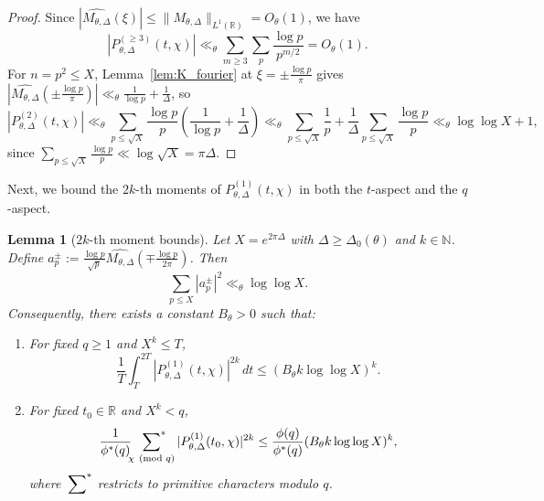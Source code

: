 \documentclass[11pt,a4paper]{amsart}
\newtheorem{lemma}[theorem]{Lemma}
\theoremstyle{remark}
\numberwithin{equation}{section}
\newcommand{\R}{\mathbb{R}}
\newcommand{\N}{\mathbb{N}}
\begin{document}
\begin{proof}
Since $|\widehat{M_{\theta,\Delta}}(\xi)| \le \|M_{\theta,\Delta}\|_{L^1(\R)} = O_\theta(1)$, we have
\[
  |P_{\theta,\Delta}^{(\ge 3)}(t,\chi)| \ll_\theta \sum_{m\ge 3}\sum_p \frac{\log p}{p^{m/2}} = O_\theta(1).
\]
For $n = p^2 \le X$, Lemma~\ref{lem:K_fourier} at $\xi = \pm\frac{\log p}{\pi}$ gives $|\widehat{M_{\theta,\Delta}}(\pm\frac{\log p}{\pi})| \ll_\theta \frac{1}{\log p} + \frac{1}{\Delta}$, so
\[
  |P_{\theta,\Delta}^{(2)}(t,\chi)| \ll_\theta \sum_{p\le\sqrt{X}}\frac{\log p}{p}\left(\frac{1}{\log p}+\frac{1}{\Delta}\right) \ll_\theta \sum_{p\le\sqrt{X}}\frac{1}{p} + \frac{1}{\Delta}\sum_{p\le\sqrt{X}}\frac{\log p}{p} \ll_\theta \log\log X + 1,
\]
since $\sum_{p\le\sqrt{X}}\frac{\log p}{p} \ll \log\sqrt{X} = \pi\Delta$.
\end{proof}

Next, we bound the $2k$-th moments of $P_{\theta,\Delta}^{(1)}(t,\chi)$ in both the $t$-aspect and the $q$-aspect.

\begin{lemma}[$2k$-th moment bounds]\label{lem:moments}
Let $X = e^{2\pi\Delta}$ with $\Delta \ge \Delta_0(\theta)$ and $k \in \N$. Define $a_p^\pm := \frac{\log p}{\sqrt{p}}\widehat{M_{\theta,\Delta}}(\mp\frac{\log p}{2\pi})$. Then
\begin{equation}\label{eq:a_p_l2}
  \sum_{p\le X} |a_p^\pm|^2 \ll_\theta \log\log X.
\end{equation}
Consequently, there exists a constant $B_\theta > 0$ such that:
\begin{enumerate}
  \item[(i)] For fixed $q \ge 1$ and $X^k \le T$,
    \[
      \frac{1}{T}\int_T^{2T} |P_{\theta,\Delta}^{(1)}(t,\chi)|^{2k}\,dt \le (B_\theta k\log\log X)^k.
    \]
  \item[(ii)] For fixed $t_0 \in \R$ and $X^k < q$,
    \[
      \frac{1}{\phi^*(q)}\sideset{}{^*}\sum_{\chi \pmod q} |P_{\theta,\Delta}^{(1)}(t_0,\chi)|^{2k} \le \frac{\phi(q)}{\phi^*(q)}(B_\theta k\log\log X)^k,
    \]
    where $\sideset{}{^*}\sum$ restricts to primitive characters modulo $q$.
\end{enumerate}
\end{lemma}
\end{document}
